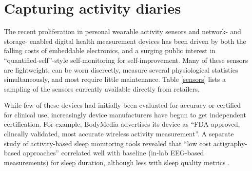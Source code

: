 \documentclass{chi-ext}
\begin{document}
\vspace{6cm}

\section{Capturing activity diaries}

The recent proliferation in personal wearable activity sensors and
network- and storage- enabled digital health measurement devices has
been driven by both the falling costs of embeddable electronics, and a
surging public interest in ``quantified-self''-style self-monitoring
for self-improvement.  Many of these sensors are lightweight, can be
worn discreetly, measure several physiological statistics
simultaneously, and most require little maintenance. Table
\ref{sensors} lists a sampling of the sensors currently available
directly from retailers.

While few of these devices had initially been evaluated for accuracy
or certified for clinical use, increasingly device manufacturers have
begun to get independent certification. For example, BodyMedia
advertises its device as ``FDA-approved, clincally validated, most
accurate wireless activity measurement''.  A separate study of
activity-based sleep monitoring tools revealed that ``low cost
actigraphy-based approaches'' correlated well with baseline (in-lab
EEG-based measurements) for sleep duration, although less with sleep
quality metrics \cite{reid1999correlation}.
\end{document}
